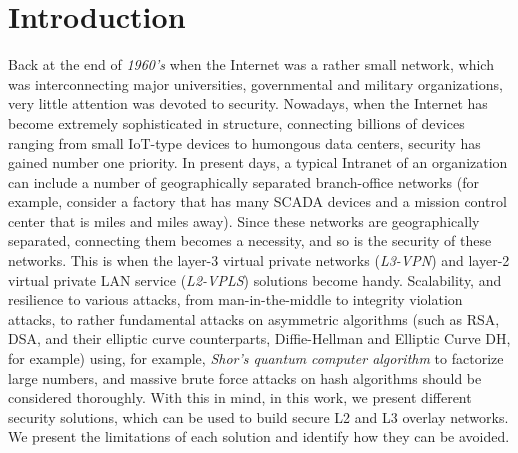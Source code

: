 \chapter{Introduction}

Back at the end of {\it 1960’s} when the Internet was a rather small 
network, which was interconnecting major universities, governmental 
and military organizations, very little attention was devoted to 
security. Nowadays, when the Internet has become extremely 
sophisticated in structure, connecting billions of devices ranging 
from small IoT-type devices to humongous data centers, security has 
gained number one priority. In present days, a typical Intranet of 
an organization can include a number of geographically separated 
branch-office networks (for example, consider a factory that has 
many SCADA devices and a mission control center that is miles and 
miles away). Since these networks are geographically separated, connecting 
them becomes a necessity, and so is the security of these networks. 
This is when the layer-3 virtual private networks ({\it L3-VPN}) and layer-2 
virtual private LAN service ({\it L2-VPLS}) solutions become handy. 
Scalability, and resilience to various attacks, from man-in-the-middle 
to integrity violation attacks, to rather fundamental attacks on 
asymmetric algorithms (such as RSA, DSA, and their elliptic curve 
counterparts, Diffie-Hellman and Elliptic Curve DH, for example) 
using, for example, {\it Shor’s quantum computer algorithm} to factorize 
large numbers, and massive brute force attacks on hash algorithms 
should be considered thoroughly. With this in mind, in this work, we 
present different security solutions, which can be used to build secure 
L2 and L3 overlay networks. We present the limitations of each solution 
and identify how they can be avoided.


